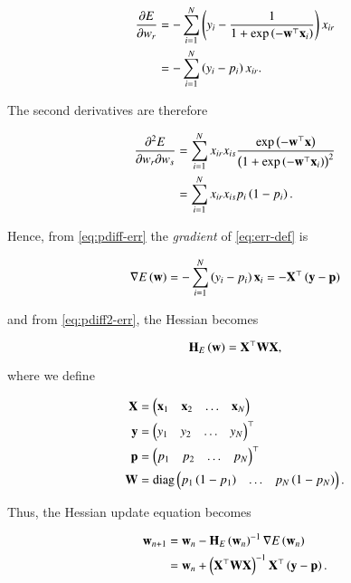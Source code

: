 \documentclass[journal,12pt,twocolumn]{IEEEtran}
\begin{document}
\begin{align}
     \pdiff{w_r}{E} &= -\sum_{i=1}^{N}\brak{y_i - \frac{1}{1 + \exp\brak{-\vec{w}^\top\vec{x}_i}}}x_{ir} \\
                    &= -\sum_{i=1}^{N}\brak{y_i - p_i}x_{ir}.
                    \label{eq:pdiff-err}
\end{align}

The second derivatives are therefore

\begin{align}
     \frac{\partial^2E}{\partial w_r \partial w_s} &= \sum_{i=1}^{N}x_{ir}x_{is}\frac{\exp\brak{-\vec{w}^\top\vec{x}}}{\brak{1 + \exp\brak{-\vec{w}^\top\vec{x}_i}}^2} \\
                                                   &= \sum_{i=1}^{N}x_{ir}x_{is}p_i\brak{1-p_i}.
     \label{eq:pdiff2-err}
\end{align}

Hence, from \eqref{eq:pdiff-err} the \emph{gradient} of \eqref{eq:err-def} is

\begin{equation}
     \nabla E\brak{\vec{w}} = -\sum_{i=1}^{N}\brak{y_i - p_i}\vec{x}_i = -\vec{X}^\top\brak{\vec{y}-\vec{p}}     
     \label{eq:grad-err}
\end{equation}

and from \eqref{eq:pdiff2-err}, the Hessian becomes

\begin{equation}
     \vec{H}_E\brak{\vec{w}} = \vec{X}^\top\vec{WX},
     \label{eq:hess-err}
\end{equation}

where we define

\begin{align}
     \boldsymbol{\mathbf{X}} &= \begin{pmatrix}\boldsymbol{\mathbf{x}}_1 & \boldsymbol{\mathbf{x}}_2 & \ldots & \boldsymbol{\mathbf{x}}_N\end{pmatrix} \label{eq:X-def} \\
     \boldsymbol{\mathbf{y}} &= \begin{pmatrix}y_1 & y_2 & \ldots & y_N\end{pmatrix}^\top \label{eq:y-def} \\
     \boldsymbol{\mathbf{p}} &= \begin{pmatrix}p_1 & p_2 & \ldots & p_N\end{pmatrix}^\top \label{eq:p-def} \\
     \boldsymbol{\mathbf{W}} &= \mathrm{diag}\begin{pmatrix}p_1\left(1-p_1\right) & \ldots & p_N\left(1-p_N\right)\end{pmatrix}. \label{eq:W-def}
\end{align}

Thus, the Hessian update equation becomes

\begin{align}
     \vec{w}_{n+1} &= \vec{w}_n - \vec{H}_E\brak{\vec{w}_n}^{-1}\nabla E\brak{\vec{w}_n} \\
                   &= \vec{w}_n + \brak{\vec{X}^\top\vec{WX}}^{-1}\vec{X}^\top\brak{\vec{y}-\vec{p}}.
                   \label{eq:hess-upd}
\end{align}
\end{document}
